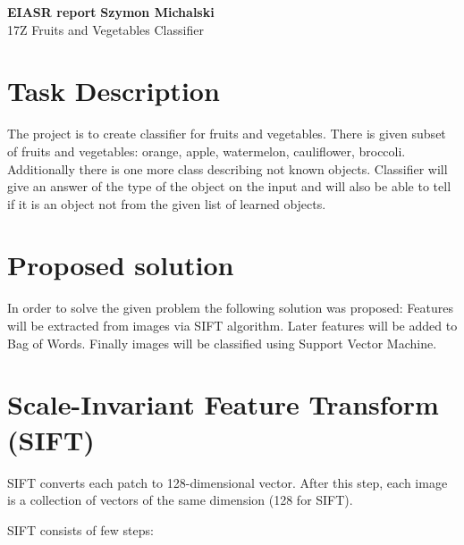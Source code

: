 \documentclass[a4paper, 11pt]{article}
\begin{document}
\noindent
\large\textbf{EIASR report} \hfill \textbf{Szymon Michalski} \\
\normalsize 17Z \hfill Fruits and Vegetables Classifier\\


\section*{Task Description}
The project is to create classifier for fruits and vegetables. 
There is given subset of fruits and vegetables: orange, apple, watermelon, cauliflower, broccoli. Additionally there is one more class describing not known objects.
Classifier will give an answer of the type of the object on the input and will also be able to tell if it is an object not from the given list of learned objects.

\section*{Proposed solution}
In order to solve the given problem the following solution was proposed:
Features will be extracted from images via SIFT algorithm. Later features will be added to Bag of Words. Finally images will be classified using Support Vector Machine.

\section*{Scale-Invariant Feature Transform (SIFT)}
SIFT converts each patch to 128-dimensional vector. After this step, each image is a collection of vectors of the same dimension (128 for SIFT).

SIFT consists of few steps:
\end{document}
